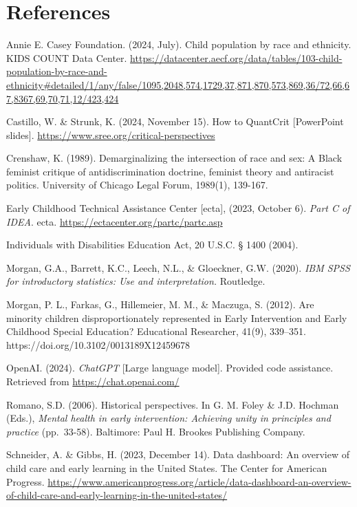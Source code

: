 \documentclass[
  letterpaper,
  DIV=11,
  numbers=noendperiod]{scrartcl}
\begin{document}
\newpage

\section{References}\label{references}

Annie E. Casey Foundation. (2024, July). Child population by race and
ethnicity. KIDS COUNT Data Center.
\url{https://datacenter.aecf.org/data/tables/103-child-population-by-race-and-ethnicity\#detailed/1/any/false/1095,2048,574,1729,37,871,870,573,869,36/72,66,67,8367,69,70,71,12/423,424}

Castillo, W. \& Strunk, K. (2024, November 15). How to QuantCrit
{[}PowerPoint slides{]}.
\url{https://www.sree.org/critical-perspectives}

Crenshaw, K. (1989). Demarginalizing the intersection of race and sex: A
Black feminist critique of antidiscrimination doctrine, feminist theory
and antiracist politics. University of Chicago Legal Forum, 1989(1),
139-167.

Early Childhood Technical Assistance Center {[}ecta{]}, (2023, October
6). \emph{Part C of IDEA}. ecta.
\url{https://ectacenter.org/partc/partc.asp}

Individuals with Disabilities Education Act, 20 U.S.C. § 1400 (2004).

Morgan, G.A., Barrett, K.C., Leech, N.L., \& Gloeckner, G.W. (2020).
\emph{IBM SPSS for introductory statistics: Use and interpretation.}
Routledge.

Morgan, P. L., Farkas, G., Hillemeier, M. M., \& Maczuga, S. (2012). Are
minority children disproportionately represented in Early Intervention
and Early Childhood Special Education? Educational Researcher, 41(9),
339--351. https://doi.org/10.3102/0013189X12459678

OpenAI. (2024). \emph{ChatGPT} {[}Large language model{]}. Provided code
assistance. Retrieved from \url{https://chat.openai.com/}

Romano, S.D. (2006). Historical perspectives. In G. M. Foley \& J.D.
Hochman (Eds.), \emph{Mental health in early intervention: Achieving
unity in principles and practice} (pp.~33-58). Baltimore: Paul H.
Brookes Publishing Company.

Schneider, A. \& Gibbs, H. (2023, December 14). Data dashboard: An
overview of child care and early learning in the United States. The
Center for American Progress.
\url{https://www.americanprogress.org/article/data-dashboard-an-overview-of-child-care-and-early-learning-in-the-united-states/}
\end{document}
